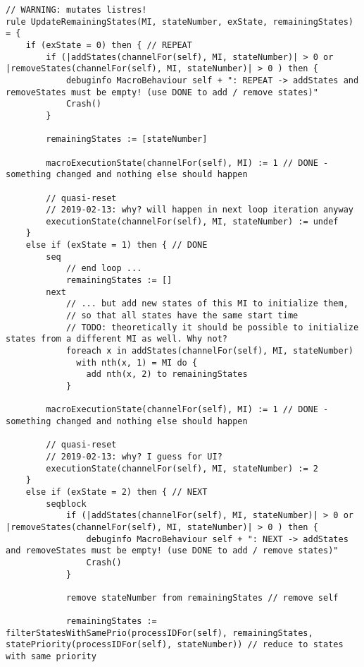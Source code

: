 \begin{listing}[H]
\begin{verbatim}
// WARNING: mutates listres!
rule UpdateRemainingStates(MI, stateNumber, exState, remainingStates) = {
    if (exState = 0) then { // REPEAT
        if (|addStates(channelFor(self), MI, stateNumber)| > 0 or |removeStates(channelFor(self), MI, stateNumber)| > 0 ) then {
            debuginfo MacroBehaviour self + ": REPEAT -> addStates and removeStates must be empty! (use DONE to add / remove states)"
            Crash()
        }

        remainingStates := [stateNumber]

        macroExecutionState(channelFor(self), MI) := 1 // DONE - something changed and nothing else should happen

        // quasi-reset
        // 2019-02-13: why? will happen in next loop iteration anyway
        executionState(channelFor(self), MI, stateNumber) := undef
    }
    else if (exState = 1) then { // DONE
        seq
            // end loop ...
            remainingStates := []
        next
            // ... but add new states of this MI to initialize them,
            // so that all states have the same start time
            // TODO: theoretically it should be possible to initialize states from a different MI as well. Why not?
            foreach x in addStates(channelFor(self), MI, stateNumber)
              with nth(x, 1) = MI do {
                add nth(x, 2) to remainingStates
            }

        macroExecutionState(channelFor(self), MI) := 1 // DONE - something changed and nothing else should happen

        // quasi-reset
        // 2019-02-13: why? I guess for UI?
        executionState(channelFor(self), MI, stateNumber) := 2
    }
    else if (exState = 2) then { // NEXT
        seqblock
            if (|addStates(channelFor(self), MI, stateNumber)| > 0 or |removeStates(channelFor(self), MI, stateNumber)| > 0 ) then {
                debuginfo MacroBehaviour self + ": NEXT -> addStates and removeStates must be empty! (use DONE to add / remove states)"
                Crash()
            }

            remove stateNumber from remainingStates // remove self

            remainingStates := filterStatesWithSamePrio(processIDFor(self), remainingStates, statePriority(processIDFor(self), stateNumber)) // reduce to states with same priority


\end{verbatim}
\end{listing}
